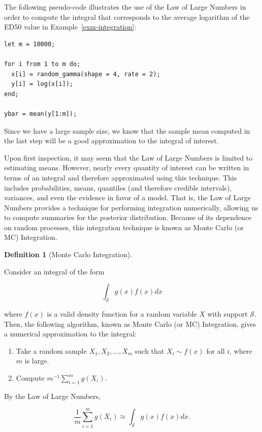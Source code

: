 \documentclass[
  letterpaper,
  DIV=11,
  numbers=noendperiod]{scrreprt}
\providecommand{\tightlist}{%
  \setlength{\itemsep}{0pt}\setlength{\parskip}{0pt}}\usepackage{longtable,booktabs,array}
\theoremstyle{definition}
\newtheorem{definition}{Definition}[chapter]
\theoremstyle{plain}
\theoremstyle{definition}
\theoremstyle{remark}
\begin{document}
The following pseudo-code illustrates the use of the Law of Large
Numbers in order to compute the integral that corresponds to the average
logarithm of the ED50 value in Example~\ref{exm-integration}:

\begin{verbatim}
let m = 10000;

for i from 1 to m do;
  x[i] = random_gamma(shape = 4, rate = 2);
  y[i] = log(x[i]);
end;
  
ybar = mean(y[1:m]);
\end{verbatim}

Since we have a large sample size, we know that the sample mean computed
in the last step will be a good approximation to the integral of
interest.

Upon first inspection, it may seem that the Law of Large Numbers is
limited to estimating means. However, nearly every quantity of interest
can be written in terms of an integral and therefore approximated using
this technique. This includes probabilities, means, quantiles (and
therefore credible intervals), variances, and even the evidence in favor
of a model. That is, the Law of Large Numbers provides a technique for
performing integration numerically, allowing us to compute summaries for
the posterior distribution. Because of its dependence on random
processes, this integration technique is known as Monte Carlo (or MC)
Integration.

\begin{definition}[Monte Carlo
Integration]\protect\hypertarget{def-mc-integration}{}\label{def-mc-integration}

Consider an integral of the form

\[\int_{\mathcal{S}} g(x) f(x) dx\]

where \(f(x)\) is a valid density function for a random variable \(X\)
with support \(\mathcal{S}\). Then, the following algorithm, known as
Monte Carlo (or MC) Integration, gives a numerical approximation to the
integral:

\begin{enumerate}
\def\labelenumi{\arabic{enumi}.}
\tightlist
\item
  Take a random sample \(X_1, X_2, \dotsc, X_m\) such that
  \(X_i \sim f(x)\) for all \(i\), where \(m\) is large.
\item
  Compute \(m^{-1} \sum_{i=1}^{m} g\left(X_i\right)\).
\end{enumerate}

By the Law of Large Numbers,

\[\frac{1}{m} \sum_{i=1}^{m} g\left(X_i\right) \approx \int_{\mathcal{S}} g(x) f(x) dx.\]

\end{definition}
\end{document}
